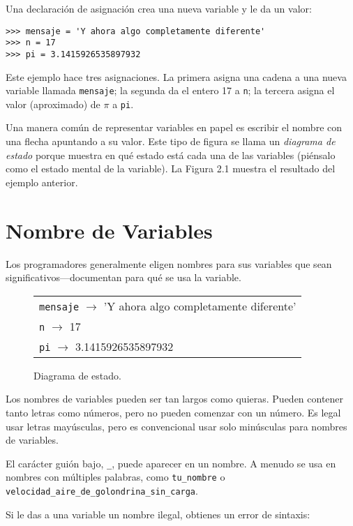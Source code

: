 \documentclass[12pt,letterpaper]{book}
\begin{document}
Una declaración de asignación crea una nueva variable y le da un valor:

\begin{verbatim}
>>> mensaje = 'Y ahora algo completamente diferente'
>>> n = 17
>>> pi = 3.1415926535897932
\end{verbatim}

Este ejemplo hace tres asignaciones. La primera asigna una cadena a una nueva variable llamada \texttt{mensaje}; la segunda da el entero 17 a \texttt{n}; la tercera asigna el valor (aproximado) de $\pi$ a \texttt{pi}.

Una manera común de representar variables en papel es escribir el nombre con una flecha apuntando a su valor. Este tipo de figura se llama un \textit{diagrama de estado} porque muestra en qué estado está cada una de las variables (piénsalo como el estado mental de la variable). La Figura 2.1 muestra el resultado del ejemplo anterior.

\section{Nombre de Variables}
Los programadores generalmente eligen nombres para sus variables que sean significativos—documentan para qué se usa la variable.

\begin{figure}[h]
\centering
\begin{tabular}{|l|}
\hline
\texttt{mensaje} $\longrightarrow$ 'Y ahora algo completamente diferente' \\
\texttt{n} $\longrightarrow$ 17 \\
\texttt{pi} $\longrightarrow$ 3.1415926535897932 \\
\hline
\end{tabular}
\caption{Diagrama de estado.}
\label{fig:diagrama-estado}
\end{figure}

Los nombres de variables pueden ser tan largos como quieras. Pueden contener tanto letras como números, pero no pueden comenzar con un número. Es legal usar letras mayúsculas, pero es convencional usar solo minúsculas para nombres de variables.

El carácter guión bajo, \texttt{\_}, puede aparecer en un nombre. A menudo se usa en nombres con múltiples palabras, como \texttt{tu\_nombre} o \texttt{velocidad\_aire\_de\_golondrina\_sin\_carga}.

Si le das a una variable un nombre ilegal, obtienes un error de sintaxis:
\end{document}

